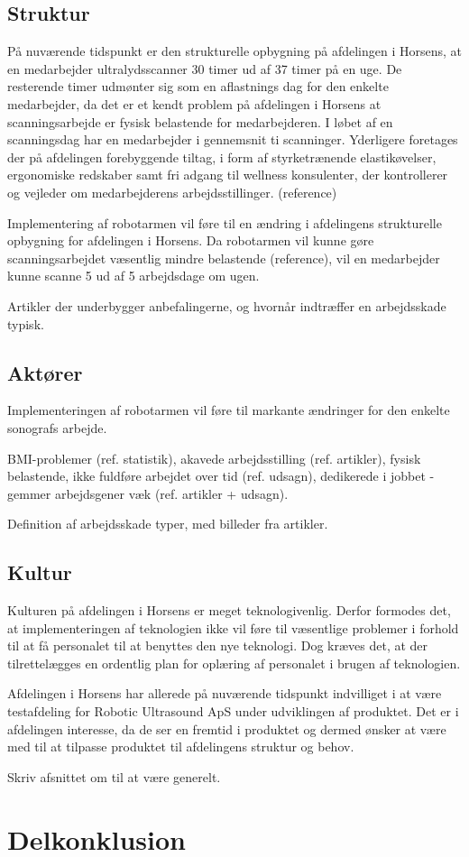 \subsection{Struktur}
På nuværende tidspunkt er den strukturelle opbygning på afdelingen i Horsens, at en medarbejder ultralydsscanner 30 timer ud af 37 timer på en uge. De resterende timer udmønter sig som en aflastnings dag for den enkelte medarbejder, da det er et kendt problem på afdelingen i Horsens at scanningsarbejde er fysisk belastende for medarbejderen. I løbet af en scanningsdag har en medarbejder i gennemsnit ti scanninger. Yderligere foretages der på afdelingen forebyggende tiltag, i form af styrketrænende elastikøvelser, ergonomiske redskaber samt fri adgang til wellness konsulenter, der kontrollerer og vejleder om medarbejderens arbejdsstillinger. (reference)

Implementering af robotarmen vil føre til en ændring i afdelingens strukturelle opbygning for afdelingen i Horsens. Da robotarmen vil kunne gøre scanningsarbejdet væsentlig mindre belastende (reference), vil en medarbejder kunne scanne 5 ud af 5 arbejdsdage om ugen.  

Artikler der underbygger anbefalingerne, og hvornår indtræffer en arbejdsskade typisk. 

\subsection{Aktører}
Implementeringen af robotarmen vil føre til markante ændringer for den enkelte sonografs arbejde.

BMI-problemer (ref. statistik), akavede arbejdsstilling (ref. artikler), fysisk belastende, ikke fuldføre arbejdet over tid (ref. udsagn), dedikerede i jobbet - gemmer arbejdsgener væk (ref. artikler + udsagn).

Definition af arbejdsskade typer, med billeder fra artikler. 

\subsection{Kultur}
Kulturen på afdelingen i Horsens er meget teknologivenlig. Derfor formodes det, at implementeringen af teknologien ikke vil føre til væsentlige problemer i forhold til at få personalet til at benyttes den nye teknologi. Dog kræves det, at der tilrettelægges en ordentlig plan for oplæring af personalet i brugen af teknologien. 

Afdelingen i Horsens har allerede på nuværende tidspunkt indvilliget i at være testafdeling for Robotic Ultrasound ApS under udviklingen af produktet. Det er i afdelingen interesse, da de ser en fremtid i produktet og dermed ønsker at være med til at tilpasse produktet til afdelingens struktur og behov.   

Skriv afsnittet om til at være generelt. 

\section{Delkonklusion}

